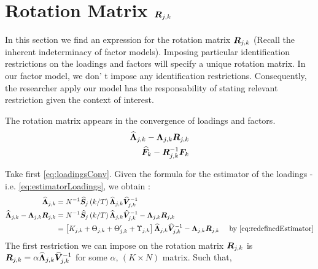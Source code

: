 \documentclass[main_document.tex]{subfiles}
\begin{document}
	\section{Rotation Matrix $\bm{R}_{j,k}$}

	In this section we find an expression for the rotation matrix $\bm{R}_{j,k}$ (Recall the inherent indeterminacy of factor models). Imposing particular identification restrictions on the loadings and factors will specify a unique rotation matrix. In our factor model, we don' t impose any identification restrictions. Consequently, the researcher apply our model has the responsability of stating relevant restriction given the context of interest. 

	The rotation matrix appears in the convergence of loadings and factors. 
	\begin{align}
		\widehat{\bm{\Lambda}}_{j,k} - \bm{\Lambda}_{j,k}\bm{R}_{j,k} \label{eq:loadingsConv}\\
		\widehat{\bm{F}}_{k} - \bm{R}_{j,k}^{-1} \bm{F}_{k} \label{eq:factorsConv}
	\end{align}
	
	Take first \eqref{eq:loadingsConv}. Given the formula for the estimator of the loadings - i.e. \eqref{eq:estimatorLoadings}, we obtain : 
	\begin{align*}
		\widehat{\bm{\Lambda}}_{j,k} &= N^{-1} \widehat{\bm{S}}_{j}\left(k/T\right) \widehat{\bm{\Lambda}}_{j,k} \widehat{\bm{V}}_{j,k}^{-1} \\
		\widehat{\bm{\Lambda}}_{j,k} - \bm{\Lambda}_{j,k}\bm{R}_{j,k} &= N^{-1} \widehat{\bm{S}}_{j}\left(k/T\right) \widehat{\bm{\Lambda}}_{j,k} \widehat{\bm{V}}_{j,k}^{-1} - \bm{\Lambda}_{j,k}\bm{R}_{j,k} \\
		&= \left[  K_{j,k} + \Theta_{j,k} + \Theta_{j,k}' + \Upsilon_{j,k} \right] \widehat{\bm{\Lambda}}_{j,k} \widehat{\bm{V}}_{j,k}^{-1} - \bm{\Lambda}_{j,k}\bm{R}_{j,k} \quad \text{ by } \eqref{eq:redefinedEstimator}
	\end{align*}
The first restriction we can impose on the rotation matrix $\bm{R}_{j,k}$ is $\bm{R}_{j,k} = \alpha \widehat{\bm{\Lambda}}_{j,k} \widehat{\bm{V}}_{j,k}^{-1}$ for some $\alpha$, $(K \times N)$ matrix. Such that, 
\end{document}
